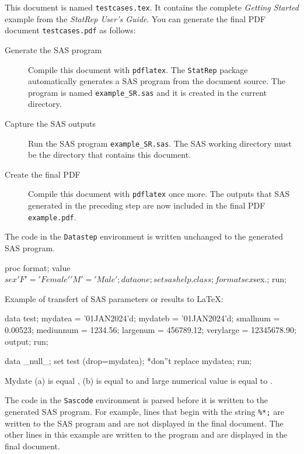 \documentclass[a4paper]{article}
\begin{document}
This document is named \texttt{testcases.tex}. 
It contains the complete \textit{Getting Started}
example from the \textit{StatRep User's Guide}.
You can generate the final PDF document \texttt{testcases.pdf} as follows:

\begin{description}
	\item[Generate the SAS program]\mbox{}\newline
	Compile this document with \texttt{pdflatex}.
	The \texttt{StatRep} package automatically generates a SAS program from
	the document source. The program is named
	\texttt{example\_SR.sas} and it is created in the current directory.
	
	\item[Capture the SAS outputs]\mbox{}\newline
	Run the SAS program \texttt{example\_SR.sas}. 
	The SAS working directory must be the directory that contains this document.
	
	\item[Create the final PDF]\mbox{}\newline
	Compile this document with \texttt{pdflatex} once more. The outputs that SAS generated
	in the preceding step are now included in the final PDF \texttt{example.pdf}.
\end{description}

The code in the \texttt{Datastep} environment is written
unchanged to the generated SAS program.

\begin{Datastep}
	proc format;
	value $sex 'F' = 'Female' 'M' = 'Male';
	data one;
	set sashelp.class;
	format sex $sex.;
	run;
\end{Datastep}


Example of transfert of SAS parameters or results to \LaTeX :

\begin{Sascode}
	data test;
	mydatea = '01JAN2024'd;
	mydateb = '01JAN2024'd;
	smallnum = 0.00523;
	mediunnum = 1234.56;
	largenum = 456789.12;
	verylarge = 12345678.90;
	output;
	run;
	
	data _null_;
	set test (drop=mydatea); *don''t replace mydatea;
	run;
\end{Sascode}

Mydate (a) is equal \mydatea, (b) is equal to \mydateb{} and large numerical value is equal to \largenum.


The code in the \texttt{Sascode} environment is parsed before it is
written to the generated SAS program. For example, lines that begin with the string
\texttt{\%*;} are written to the SAS program and are not displayed in the 
final document. The other lines in this example are written to the program 
and are displayed in the final document.
\end{document}
